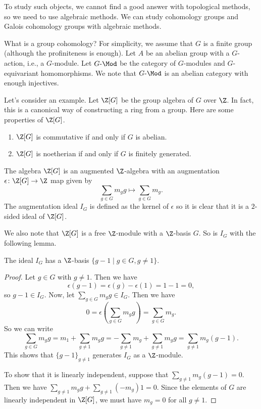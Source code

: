 To study such objects,
we cannot find a good answer with topological methods, so we need to use algebraic methods.
We can study cohomology groups and Galois cohomology groups with algebraic methods.

What is a group cohomology?
For simplicity, we assume that $G$ is a finite group (although the profiniteness is enough).
Let $A$ be an abelian group with a $G$-action, i.e., a $G$-module.
Let $G\text{-}\Mod$ be the category of $G$-modules and $G$-equivariant homomorphisms.
We note that $G\text{-}\Mod$ is an abelian category with enough injectives.

Let's consider an example.
Let $\Z[G]$ be the group algebra of $G$ over $\Z$.
In fact, this is a canonical way of constructing a ring from a group.
Here are some properties of $\Z[G]$.
\begin{remark}\noindent
    \begin{enumerate}
        \item $\Z[G]$ is commutative if and only if $G$ is abelian.
        \item $\Z[G]$ is noetherian if and only if $G$ is finitely generated.
    \end{enumerate}
\end{remark}

\begin{remark}
    The algebra $\Z[G]$ is an augmented $\Z$-algebra
    with an augmentation $\epsilon\colon \Z[G] \to \Z$ map given by
    \[
        \sum_{g \in G} m_g g \longmapsto \sum_{g \in G} m_g.
    \]
    The augmentation ideal $I_G$ is defined as the kernel of $\epsilon$ so it is clear that it is a $2$-sided ideal of $\Z[G]$.
\end{remark}

We also note that $\Z[G]$ is a free $\Z$-module with a $\Z$-basis $G$.
So is $I_G$ with the following lemma.

\begin{lemma}
    The ideal $I_G$ has a $\Z$-basis $\{g - 1 \mid g \in G, g \neq 1\}$.
\end{lemma}
\begin{proof}
    Let $g \in G$ with $g \neq 1$. Then we have
    \[
        \epsilon(g - 1) = \epsilon(g) - \epsilon(1) = 1 - 1 = 0,
    \]
    so $g - 1 \in I_G$. Now, let $\sum_{g \in G} m_g g \in I_G$.
    Then we have
    \[
        0 = \epsilon\left(\sum_{g \in G} m_g g\right) = \sum_{g \in G} m_g.
    \]
    So we can write
    \[
        \sum_{g \in G} m_g g = m_1 + \sum_{g \neq 1} m_g g
        = -\sum_{g \neq 1} m_g + \sum_{g \neq 1} m_g g
        = \sum_{g \neq 1} m_g (g - 1).
    \]
    This shows that $\{g - 1\}_{g\neq 1}$ generates $I_G$ as a $\Z$-module.

    To show that it is linearly independent, suppose that
    $\sum_{g\neq 1} m_g (g - 1) = 0$. Then we have
    $\sum_{g\neq 1} m_g g + \sum_{g\neq 1} (-m_g)1 = 0$.
    Since the elements of $G$ are linearly independent in $\Z[G]$, we must have $m_g = 0$ for all $g\neq 1$.
\end{proof}

